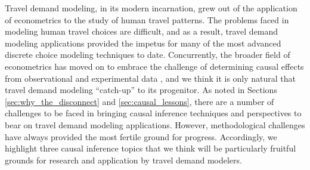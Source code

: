 Travel demand modeling, in its modern incarnation, grew out of the application of econometrics to the study of human travel patterns. The problems faced in modeling human travel choices are difficult, and as a result, travel demand modeling applications provided the impetus for many of the most advanced discrete choice modeling techniques to date. Concurrently, the broader field of econometrics has moved on to embrace the challenge of determining causal effects from observational and experimental data \citep{angrist2010credibility}, and we think it is only natural that travel demand modeling ``catch-up'' to its progenitor. As noted in Sections \ref{sec:why_the_disconnect} and \ref{sec:causal_lessons}, there are a number of challenges to be faced in bringing causal inference techniques and perspectives to bear on travel demand modeling applications. However, methodological challenges have always provided the most fertile ground for progress. Accordingly, we highlight three causal inference topics that we think will be particularly fruitful grounds for research and application by travel demand modelers.

